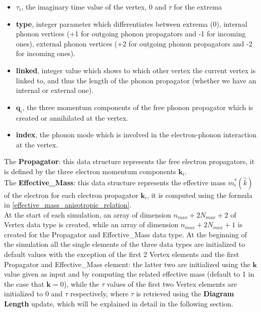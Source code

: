 \begin{itemize}
    \item $\tau_i$, the imaginary time value of the vertex, 0 and $\tau$ for the extrema
    \item \textbf{type}, integer parameter which differentiates between extrema (0), internal phonon vertices (+1 for outgoing phonon propagators 
    and -1 for incoming ones), external phonon vertices (+2 for outgoing phonon propagators and -2 for incoming ones).
    \item \textbf{linked}, integer value which shows to which other vertex the current vertex is linked to, and thus the length of the 
    phonon propagator (whether we have an internal or external one).
    \item $\mathbf{q}_i$, the three momentum components of the free phonon propagator which is created or annihilated at the vertex.
    \item \textbf{index}, the phonon mode which is involved in the electron-phonon interaction at the vertex. 
\end{itemize}
The \textbf{Propagator}: this data structure represents the free electron propagators, it is defined by the three electron momentum components 
$\mathbf{k}_i$.\\
The \textbf{Effective\_Mass}: this data structure represents the effective mass $m^*_i(\hat{k})$ of the electron for each electron propagator $\mathbf{k}_i$, 
it is computed using the formula in \ref{effective_mass_anisotropic_relation}.\\
At the start of each simulation, an array of dimension $n_{max}+2N_{max}+2$ of Vertex data type is created, while an array of dimension 
$n_{max}+2N_{max}+1$ is created for the Propagator and Effective\_Mass data type. At the beginning of the simulation all the single elements of the three data types 
are initialized to default values with the exception of the first 2 Vertex elements and the first Propagator and Effective\_Mass 
element: the latter two are initialized using the $\mathbf{k}$ value given as input and by computing the related effective mass (default to 
1 in the case that $\mathbf{k}=0$), while the $\tau$ values of the first two Vertex elements are initialized to 0 and $\tau$ respectively, where 
$\tau$ is retrieved using the \textbf{Diagram Length} update, which will be explained in detail in the following section.
